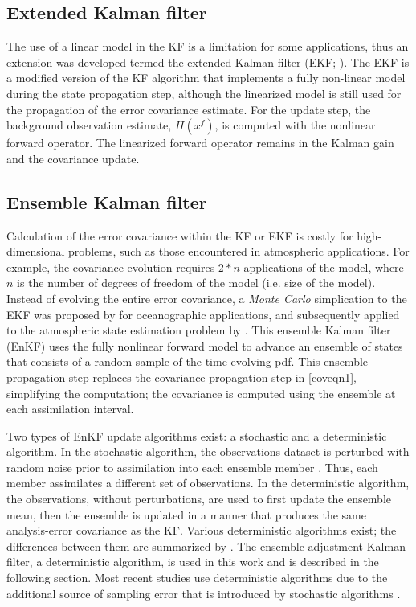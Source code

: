 \subsection{Extended Kalman filter}
The use of a linear model in the KF is a limitation for some applications, thus an extension was developed termed the extended Kalman filter (EKF; \citealt{jazwinski70}). The EKF is a modified version of the KF algorithm that implements a fully non-linear model during the state propagation step, although the linearized model is still used for the propagation of the error covariance estimate. For the update step, the background observation estimate, \(H(x^f)\), is computed with the nonlinear forward operator. The linearized forward operator remains in the Kalman gain and the covariance update.

\subsection{Ensemble Kalman filter}
Calculation of the error covariance within the KF or EKF is costly for high-dimensional problems, such as those encountered in atmospheric applications. For example, the covariance evolution requires \(2*n\) applications of the model, where \(n\) is the number of degrees of freedom of the model (i.e. size of the model). Instead of evolving the entire error covariance, a {\it Monte Carlo} simplication to the EKF was proposed by \citet{evensen94} for oceanographic applications, and subsequently applied to the atmospheric state estimation problem by \citet{houtekamermitchell98}. This ensemble Kalman filter (EnKF) uses the fully nonlinear forward model to advance an ensemble of states that consists of a random sample of the time-evolving pdf. This ensemble propagation step replaces the covariance propagation step in \ref{coveqn1}, simplifying the computation; the covariance is computed using the ensemble at each assimilation interval. 

Two types of EnKF update algorithms exist: a stochastic and a deterministic algorithm. In the stochastic algorithm, the observations dataset is perturbed with random noise prior to assimilation into each ensemble member \citep{houtekamermitchell98,hamillsnyder02}. Thus, each member assimilates a different set of observations. In the deterministic algorithm, the observations, without perturbations, are used to first update the ensemble mean, then the ensemble is updated in a manner that produces the same analysis-error covariance as the KF. Various deterministic algorithms exist; the differences between them are summarized by \citet{tippett03}. The ensemble adjustment Kalman filter, a deterministic algorithm, is used in this work and is described in the following section. Most recent studies use deterministic algorithms due to the additional source of sampling error that is introduced by stochastic algorithms \citep{whitakerhamill02}.

